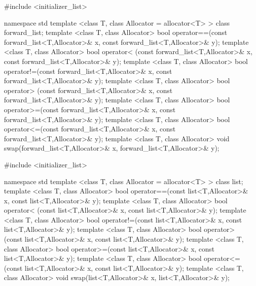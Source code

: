 %

\begin{codeblock}
#include <initializer_list>

namespace std {
  template <class T, class Allocator = allocator<T> > class forward_list;
  template <class T, class Allocator>
    bool operator==(const forward_list<T,Allocator>& x, const forward_list<T,Allocator>& y);
  template <class T, class Allocator>
    bool operator< (const forward_list<T,Allocator>& x, const forward_list<T,Allocator>& y);
  template <class T, class Allocator>
    bool operator!=(const forward_list<T,Allocator>& x, const forward_list<T,Allocator>& y);
  template <class T, class Allocator>
    bool operator> (const forward_list<T,Allocator>& x, const forward_list<T,Allocator>& y);
  template <class T, class Allocator>
    bool operator>=(const forward_list<T,Allocator>& x, const forward_list<T,Allocator>& y);
  template <class T, class Allocator>
    bool operator<=(const forward_list<T,Allocator>& x, const forward_list<T,Allocator>& y);
  template <class T, class Allocator>
    void swap(forward_list<T,Allocator>& x, forward_list<T,Allocator>& y);
}
\end{codeblock}

%

\begin{codeblock}
#include <initializer_list>

namespace std {
  template <class T, class Allocator = allocator<T> > class list;
  template <class T, class Allocator>
    bool operator==(const list<T,Allocator>& x, const list<T,Allocator>& y);
  template <class T, class Allocator>
    bool operator< (const list<T,Allocator>& x, const list<T,Allocator>& y);
  template <class T, class Allocator>
    bool operator!=(const list<T,Allocator>& x, const list<T,Allocator>& y);
  template <class T, class Allocator>
    bool operator> (const list<T,Allocator>& x, const list<T,Allocator>& y);
  template <class T, class Allocator>
    bool operator>=(const list<T,Allocator>& x, const list<T,Allocator>& y);
  template <class T, class Allocator>
    bool operator<=(const list<T,Allocator>& x, const list<T,Allocator>& y);
  template <class T, class Allocator>
    void swap(list<T,Allocator>& x, list<T,Allocator>& y);
}
\end{codeblock}

%

